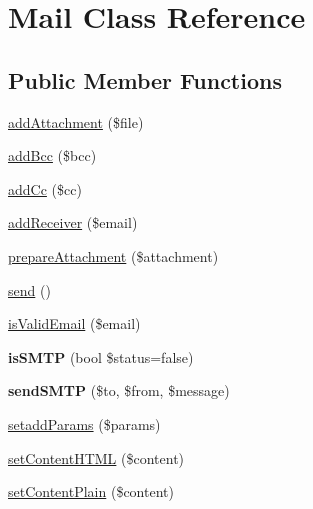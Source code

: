 \hypertarget{class_zest_1_1_mail_1_1_mail}{}\section{Mail Class Reference}
\label{class_zest_1_1_mail_1_1_mail}
\subsection*{Public Member Functions}
\begin{DoxyCompactItemize}
\item 
\mbox{\hyperlink{class_zest_1_1_mail_1_1_mail_ac987d3ae027d5659e29971c057067a74}{add\+Attachment}} (\$file)
\item 
\mbox{\hyperlink{class_zest_1_1_mail_1_1_mail_af3caeb841610ad2fa4dcbbc4d157eee8}{add\+Bcc}} (\$bcc)
\item 
\mbox{\hyperlink{class_zest_1_1_mail_1_1_mail_aa6928c70ebce7734d8b21ae2c41065da}{add\+Cc}} (\$cc)
\item 
\mbox{\hyperlink{class_zest_1_1_mail_1_1_mail_a31cd1494886ccd0d0734bfc229f95d9f}{add\+Receiver}} (\$email)
\item 
\mbox{\hyperlink{class_zest_1_1_mail_1_1_mail_af2eba74758819578cec6df5de4a8daf6}{prepare\+Attachment}} (\$attachment)
\item 
\mbox{\hyperlink{class_zest_1_1_mail_1_1_mail_a12bcef5130168b80d3d52dc82213f19a}{send}} ()
\item 
\mbox{\hyperlink{class_zest_1_1_mail_1_1_mail_ae48b4d105b2d71bd9c3f88fdf3666058}{is\+Valid\+Email}} (\$email)
\item 
\mbox{\label{class_zest_1_1_mail_1_1_mail_a0f209abcdc9b0fc6073aaea5501d010b}} 
{\bfseries is\+S\+M\+TP} (bool \$status=false)
\item 
\mbox{\label{class_zest_1_1_mail_1_1_mail_ac9666ecb59fa08e40f8f92b44a203159}} 
{\bfseries send\+S\+M\+TP} (\$to, \$from, \$message)
\item 
\mbox{\hyperlink{class_zest_1_1_mail_1_1_mail_afeb2c23899fa9c5524de47099eccfa12}{setadd\+Params}} (\$params)
\item 
\mbox{\hyperlink{class_zest_1_1_mail_1_1_mail_a72cc5793eec52f5f7d25048e7e7c11cf}{set\+Content\+H\+T\+ML}} (\$content)
\item 
\mbox{\hyperlink{class_zest_1_1_mail_1_1_mail_acc1f3676088abeb7ce453636940cde91}{set\+Content\+Plain}} (\$content)

\end{DoxyCompactItemize}
